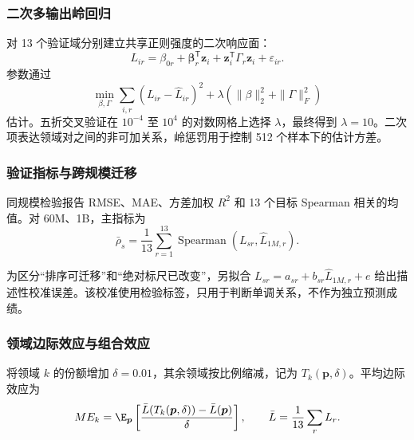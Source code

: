 \documentclass[bwprint]{gmcmthesis}
\begin{document}
        \subsubsection{二次多输出岭回归}    %
        对 13 个验证域分别建立共享正则强度的二次响应面：
        \begin{equation}
        L_{ir}=\beta_{0r}+\bm\beta_r^{\mathsf T}\bm z_i
        +\bm z_i^{\mathsf T}\Gamma_r\bm z_i+\varepsilon_{ir}.
        \label{eq:ridge}
        \end{equation}
        参数通过
        \begin{equation}
        \min_{\beta,\Gamma}\sum_{i,r}(L_{ir}-\widehat L_{ir})^2
        +\lambda\left(\|\beta\|_2^2+\|\Gamma\|_F^2\right)
        \label{eq:ridgeobjective}
        \end{equation}
        估计。五折交叉验证在 $10^{-4}$ 至 $10^4$ 的对数网格上选择 $\lambda$，最终得到 $\lambda=10$。二次项表达领域对之间的非可加关系，岭惩罚用于控制 512 个样本下的估计方差。

        
        \subsubsection{验证指标与跨规模迁移}  %
        同规模检验报告 RMSE、MAE、方差加权 $R^2$ 和 13 个目标 Spearman 相关的均值。对 60M、1B，主指标为
        \begin{equation}
        \bar\rho_s=\frac1{13}\sum_{r=1}^{13}
        \operatorname{Spearman}(L_{sr},\widehat L_{1M,r}).
        \label{eq:spearman}
        \end{equation}
        
        为区分``排序可迁移''和``绝对标尺已改变''，另拟合
        $L_{sr}=a_{sr}+b_{sr}\widehat L_{1M,r}+e$ 给出描述性校准误差。该校准使用检验标签，只用于判断单调关系，不作为独立预测成绩。

        
        \subsubsection{领域边际效应与组合效应} %
        将领域 $k$ 的份额增加 $\delta=0.01$，其余领域按比例缩减，记为 $T_k(\bm p,\delta)$。平均边际效应为
        \begin{equation}
        ME_k=\E_{\bm p}\left[
        \frac{\bar L(T_k(\bm p,\delta))-\bar L(\bm p)}{\delta}
        \right],\qquad
        \bar L=\frac1{13}\sum_rL_r.
        \label{eq:marginal}
        \end{equation}
        
\end{document}
